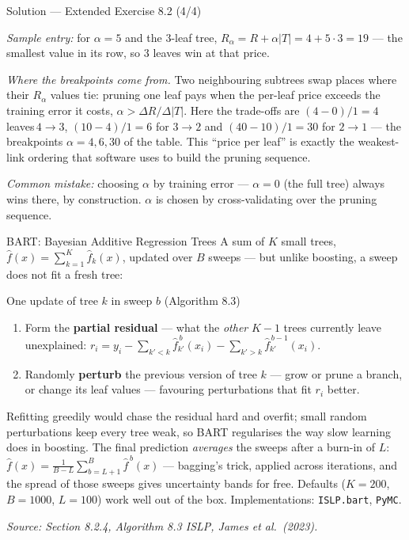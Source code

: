 \documentclass[aspectratio=169,11pt]{beamer}
\newcommand{\islpsource}[1]{%
  \vfill\hfill{\tiny\itshape\color{gray}Source: #1 \textemdash{} ISLP, James et al.\ (2023).}\par
}
\begin{document}
\begin{frame}{Solution --- Extended Exercise 8.2 (4/4)}
\begin{solutionbox}
\emph{Sample entry:} for $\alpha=5$ and the $3$-leaf tree, $R_\alpha=R+\alpha|T|=4+5\cdot3=19$ --- the smallest value in its row, so $3$ leaves win at that price.

\medskip
\emph{Where the breakpoints come from.} Two neighbouring subtrees swap
places where their $R_\alpha$ values tie: pruning one leaf pays when the
per-leaf price exceeds the training error it costs,
$\alpha > \Delta R/\Delta|T|$. Here the trade-offs are
$(4-0)/1 = 4$ leaves$\,4\to3$, $(10-4)/1 = 6$ for $3\to2$ and
$(40-10)/1 = 30$ for $2\to1$ --- the breakpoints $\alpha = 4, 6, 30$ of
the table. This ``price per leaf'' is exactly the weakest-link ordering
that software uses to build the pruning sequence.

\smallskip
\textit{Common mistake:} choosing $\alpha$ by training error --- $\alpha=0$ (the full tree) always wins there, by construction. $\alpha$ is chosen by cross-validating over the pruning sequence.
\end{solutionbox}
\end{frame}

\begin{frame}{BART: Bayesian Additive Regression Trees}\label{frm:bart}
  \footnotesize
  A sum of $K$ small trees, $\hat f(x)=\sum_{k=1}^{K}\hat f_k(x)$, updated
  over $B$ sweeps --- but unlike boosting, a sweep does not fit a fresh
  tree:
  \begin{block}{One update of tree $k$ in sweep $b$ (Algorithm 8.3)}
    \begin{enumerate}
      \item Form the \textbf{partial residual} --- what the \emph{other}
            $K-1$ trees currently leave unexplained:
            $r_i = y_i - \sum_{k'<k}\hat f^{\,b}_{k'}(x_i)
                       - \sum_{k'>k}\hat f^{\,b-1}_{k'}(x_i)$.
      \item Randomly \textbf{perturb} the previous version of tree $k$ ---
            grow or prune a branch, or change its leaf values --- favouring
            perturbations that fit $r_i$ better.
    \end{enumerate}
  \end{block}
  \begin{takeaway}
    Refitting greedily would chase the residual hard and overfit; small
    random perturbations keep every tree weak, so BART regularises the way
    slow learning does in boosting. The final prediction \emph{averages}
    the sweeps after a burn-in of $L$:
    $\hat f(x)=\frac{1}{B-L}\sum_{b=L+1}^{B}\hat f^{\,b}(x)$ --- bagging's
    trick, applied across iterations, and the spread of those sweeps gives
    uncertainty bands for free. Defaults ($K=200$, $B=1000$, $L=100$) work
    well out of the box. Implementations: \texttt{ISLP.bart}, \texttt{PyMC}.
  \end{takeaway}
  \islpsource{Section 8.2.4, Algorithm 8.3}
\end{frame}
\end{document}
